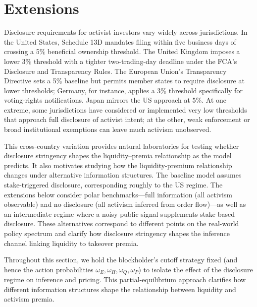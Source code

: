 \documentclass[11pt]{article}
\newcommand{\1}{\mathbf{1}}
\begin{document}
\section{Extensions}
\label{sec:extensions}

Disclosure requirements for activist investors vary widely across jurisdictions. In the United States, Schedule 13D mandates filing within five business days of crossing a 5\% beneficial ownership threshold. The United Kingdom imposes a lower 3\% threshold with a tighter two-trading-day deadline under the FCA's Disclosure and Transparency Rules. The European Union's Transparency Directive sets a 5\% baseline but permits member states to require disclosure at lower thresholds; Germany, for instance, applies a 3\% threshold specifically for voting-rights notifications. Japan mirrors the US approach at 5\%. At one extreme, some jurisdictions have considered or implemented very low thresholds that approach full disclosure of activist intent; at the other, weak enforcement or broad institutional exemptions can leave much activism unobserved.

This cross-country variation provides natural laboratories for testing whether disclosure stringency shapes the liquidity--premia relationship as the model predicts. It also motivates studying how the liquidity-premium relationship changes under alternative information structures. The baseline model assumes stake-triggered disclosure, corresponding roughly to the US regime. The extensions below consider polar benchmarks---full information (all activism observable) and no disclosure (all activism inferred from order flow)---as well as an intermediate regime where a noisy public signal supplements stake-based disclosure. These alternatives correspond to different points on the real-world policy spectrum and clarify how disclosure stringency shapes the inference channel linking liquidity to takeover premia.

Throughout this section, we hold the blockholder's cutoff strategy fixed (and hence the action probabilities $\omega_E,\omega_H,\omega_Q,\omega_P$) to isolate the effect of the disclosure regime on inference and pricing. This partial-equilibrium approach clarifies how different information structures shape the relationship between liquidity and activism premia.

\end{document}
